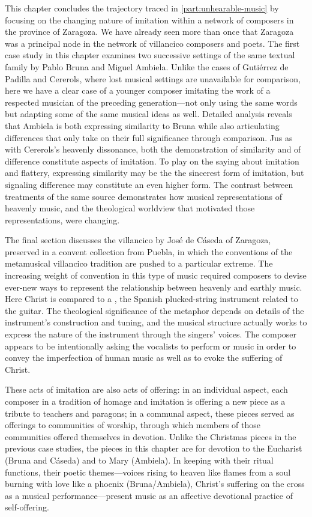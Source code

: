 This chapter concludes the trajectory traced in \cref{part:unhearable-music} by
focusing on the changing nature of imitation within a network of composers in
the province of Zaragoza.
We have already seen more than once that Zaragoza was a principal node in the
network of villancico composers and poets.
The first case study in this chapter examines two successive settings of the
same textual family by Pablo Bruna and Miguel Ambiela.
Unlike the cases of Gutiérrez de Padilla and Cererols, where lost
musical settings are unavailable for comparison, here we have a clear case of a
younger composer imitating the work of a respected musician of the preceding
generation---not only using the same words but adapting some of the same musical
ideas as well.
Detailed analysis reveals that Ambiela is both expressing similarity to Bruna
while also articulating differences that only take on their full significance
through comparison.
Jus as with Cererols's heavenly dissonance, both the demonstration of similarity
and of difference constitute aspects of imitation.
To play on the saying about imitation and flattery, expressing similarity may be
the the sincerest form of imitation, but signaling difference may constitute an
even higher form.
The contrast between treatments of the same source demonstrates how musical
representations of heavenly music, and the theological worldview that motivated
those representations, were changing.  

The final section discusses the villancico  by José de
Cáseda of Zaragoza, preserved in a convent collection from Puebla, in which the
conventions of the metamusical villancico tradition are pushed to a particular
extreme.
The increasing weight of convention in this type of music required composers to
devise ever-new ways to represent the relationship between heavenly and earthly
music.
Here Christ is compared to a , the Spanish plucked-string
instrument related to the guitar.
The theological significance of the metaphor depends on details of the
instrument's construction and tuning, and the musical structure actually works
to express the nature of the instrument through the singers' voices.
The composer appears to be intentionally asking the vocalists to perform
 or  music in order to convey the imperfection of
human music as well as to evoke the suffering of Christ.

These acts of imitation are also acts of offering: in an individual aspect, each
composer in a tradition of homage and imitation is offering a new piece as a
tribute to teachers and paragons; in a communal aspect, these pieces served as
offerings to communities of worship, through which members of those communities
offered themselves in devotion. 
Unlike the Christmas pieces in the previous case studies, the pieces in this
chapter are for devotion to the Eucharist (Bruna and Cáseda) and to Mary
(Ambiela).  
In keeping with their ritual functions, their poetic themes---voices rising to
heaven like flames from a soul burning with love like a phoenix (Bruna/Ambiela),
Christ's suffering on the cross as a musical performance---present music as an
affective devotional practice of self-offering.

